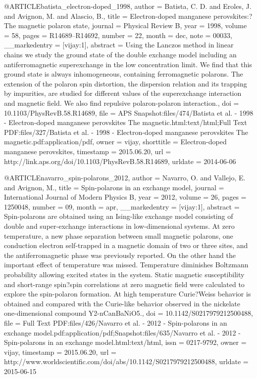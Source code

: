 @ARTICLE{batista_electron-doped_1998,
  author = {Batista, C. D. and Eroles, J. and Avignon, M. and Alascio, B.},
  title = {Electron-doped manganese perovskites:?{The} magnetic polaron state},
  journal = {Physical Review B},
  year = {1998},
  volume = {58},
  pages = {R14689--R14692},
  number = {22},
  month = dec,
  note = {00033},
  __markedentry = {[vijay:1]},
  abstract = {Using the Lanczos method in linear chains we study the ground state
	of the double exchange model including an antiferromagnetic superexchange
	in the low concentration limit. We find that this ground state is
	always inhomogeneous, containing ferromagnetic polarons. The extension
	of the polaron spin distortion, the dispersion relation and its trapping
	by impurities, are studied for different values of the superexchange
	interaction and magnetic field. We also find repulsive polaron-polaron
	interaction.},
  doi = {10.1103/PhysRevB.58.R14689},
  file = {APS Snapshot:files/474/Batista et al. - 1998 - Electron-doped manganese perovskites The magnetic.html:text/html;Full Text PDF:files/327/Batista et al. - 1998 - Electron-doped manganese perovskites The magnetic.pdf:application/pdf},
  owner = {vijay},
  shorttitle = {Electron-doped manganese perovskites},
  timestamp = {2015.06.20},
  url = {http://link.aps.org/doi/10.1103/PhysRevB.58.R14689},
  urldate = {2014-06-06}
}

@ARTICLE{navarro_spin-polarons_2012,
  author = {Navarro, O. and Vallejo, E. and Avignon, M.},
  title = {Spin-polarons in an exchange model},
  journal = {International Journal of Modern Physics B},
  year = {2012},
  volume = {26},
  pages = {1250048},
  number = {09},
  month = apr,
  __markedentry = {[vijay:1]},
  abstract = {Spin-polarons are obtained using an Ising-like exchange model consisting
	of double and super-exchange interactions in low-dimensional systems.
	At zero temperature, a new phase separation between small magnetic
	polarons, one conduction electron self-trapped in a magnetic domain
	of two or three sites, and the antiferromagnetic phase was previously
	reported. On the other hand the important effect of temperature was
	missed. Temperature diminishes Boltzmann probability allowing excited
	states in the system. Static magnetic susceptibility and short-range
	spin?spin correlations at zero magnetic field were calculated to
	explore the spin-polaron formation. At high temperature Curie?Weiss
	behavior is obtained and compared with the Curie-like behavior observed
	in the nickelate one-dimensional compound Y2-nCanBaNiO5.},
  doi = {10.1142/S0217979212500488},
  file = {Full Text PDF:files/426/Navarro et al. - 2012 - Spin-polarons in an exchange model.pdf:application/pdf;Snapshot:files/635/Navarro et al. - 2012 - Spin-polarons in an exchange model.html:text/html},
  issn = {0217-9792},
  owner = {vijay},
  timestamp = {2015.06.20},
  url = {http://www.worldscientific.com/doi/abs/10.1142/S0217979212500488},
  urldate = {2015-06-15}
}

